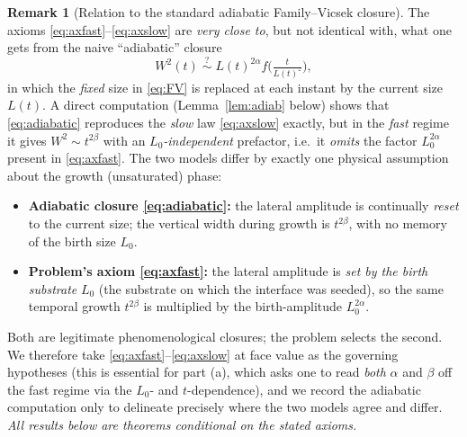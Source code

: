 \documentclass{amsart}
\theoremstyle{definition}
\newtheorem{remark}{Remark}
\newcommand{\asymp}{\sim}
\begin{document}
\begin{remark}[Relation to the standard adiabatic Family--Vicsek closure]
\label{rem:closure}
The axioms \eqref{eq:axfast}--\eqref{eq:axslow} are \emph{very close to}, but not
identical with, what one gets from the naive ``adiabatic'' closure
\begin{equation}\label{eq:adiabatic}
  W^2(t)\;\overset{?}{\asymp}\;L(t)^{2\alpha}f\!\Big(\tfrac{t}{L(t)^{z}}\Big),
\end{equation}
in which the \emph{fixed} size in \eqref{eq:FV} is replaced at each instant by the
current size $L(t)$. A direct computation (Lemma~\ref{lem:adiab} below) shows that
\eqref{eq:adiabatic} reproduces the \emph{slow} law \eqref{eq:axslow} exactly, but
in the \emph{fast} regime it gives $W^2\asymp t^{2\beta}$ with an
\emph{$L_0$-independent} prefactor, i.e.\ it \emph{omits} the factor $L_0^{2\alpha}$
present in \eqref{eq:axfast}. The two models differ by exactly one physical
assumption about the growth (unsaturated) phase:
\begin{itemize}
\item \textbf{Adiabatic closure \eqref{eq:adiabatic}:} the lateral amplitude is
  continually \emph{reset} to the current size; the vertical width during growth is
  $t^{2\beta}$, with no memory of the birth size $L_0$.
\item \textbf{Problem's axiom \eqref{eq:axfast}:} the lateral amplitude is
  \emph{set by the birth substrate} $L_0$ (the substrate on which the interface was
  seeded), so the same temporal growth $t^{2\beta}$ is multiplied by the
  birth-amplitude $L_0^{2\alpha}$.
\end{itemize}
Both are legitimate phenomenological closures; the problem selects the second. We
therefore take \eqref{eq:axfast}--\eqref{eq:axslow} at face value as the governing
hypotheses (this is essential for part (a), which asks one to read \emph{both}
$\alpha$ and $\beta$ off the fast regime via the $L_0$- and $t$-dependence), and we
record the adiabatic computation only to delineate precisely where the two models
agree and differ. \emph{All results below are theorems conditional on the stated
axioms.}
\end{remark}
\end{document}
